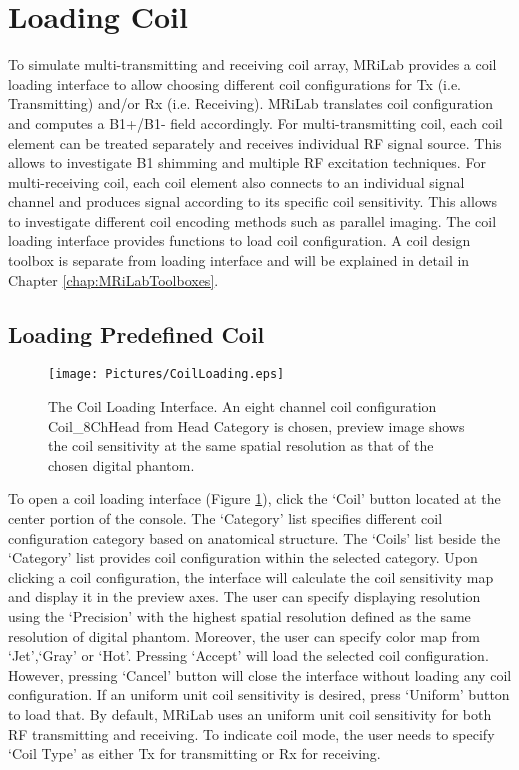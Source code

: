\documentclass{book}%
\begin{document}
\section{Loading Coil}
To simulate multi-transmitting and receiving coil array, MRiLab provides a coil loading interface to allow choosing different coil configurations for Tx (i.e. Transmitting) and/or Rx (i.e. Receiving). MRiLab translates coil configuration and computes a B1+/B1- field accordingly. For multi-transmitting coil, each coil element can be treated separately and receives individual RF signal source. This allows to investigate B1 shimming and multiple RF excitation techniques. For multi-receiving coil, each coil element also connects to an individual signal channel and produces signal according to its specific coil sensitivity. This allows to investigate different coil encoding methods such as parallel imaging. The coil loading interface provides functions to load coil configuration. A coil design toolbox is separate from loading interface and will be explained in detail in Chapter \ref{chap:MRiLabToolboxes}.

\subsection{Loading Predefined Coil}

\begin{figure}[htbp]
	\centering
		\texttt{[image: Pictures/CoilLoading.eps]}
	\caption{The Coil Loading Interface. An eight channel coil configuration Coil\_8ChHead from Head Category is chosen, preview image shows the coil sensitivity at the same spatial resolution as that of the chosen digital phantom.}
	\label{fig:CoilLoading}
\end{figure}

To open a coil loading interface (Figure \ref{fig:CoilLoading}), click the `Coil' button located at the center portion of the console. The `Category' list specifies different coil configuration category based on anatomical structure. The `Coils' list beside the `Category' list provides coil configuration within the selected category. Upon clicking a coil configuration, the interface will calculate the coil sensitivity map and display it in the preview axes. The user can specify displaying resolution using the `Precision' with the highest spatial resolution defined as the same resolution of digital phantom. Moreover, the user can specify color map from `Jet',`Gray' or `Hot'. Pressing `Accept' will load the selected coil configuration. However, pressing `Cancel' button will close the interface without loading any coil configuration. If an uniform unit coil sensitivity is desired, press `Uniform' button to load that. By default, MRiLab uses an uniform unit coil sensitivity for both RF transmitting and receiving. To indicate coil mode, the user needs to specify `Coil Type' as either Tx for transmitting or Rx for receiving. \\ 
\end{document}
